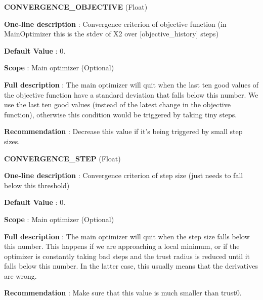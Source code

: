 \begin{DoxyItemize}
\item {\bfseries  \-C\-O\-N\-V\-E\-R\-G\-E\-N\-C\-E\-\_\-\-O\-B\-J\-E\-C\-T\-I\-V\-E } (\-Float) \par
{\bfseries  \-One-\/line description }\-: \-Convergence criterion of objective function (in \-Main\-Optimizer this is the stdev of \-X2 over \mbox{[}objective\-\_\-history\mbox{]} steps) \par
{\bfseries  \-Default \-Value }\-: 0. \par
{\bfseries  \-Scope }\-: \-Main optimizer (\-Optional) \par
{\bfseries  \-Full description }\-: \-The main optimizer will quit when the last ten good values of the objective function have a standard deviation that falls below this number. \-We use the last ten good values (instead of the latest change in the objective function), otherwise this condition would be triggered by taking tiny steps. \par
{\bfseries  \-Recommendation }\-: \-Decrease this value if it's being triggered by small step sizes.\end{DoxyItemize}
\begin{DoxyItemize}
\item {\bfseries  \-C\-O\-N\-V\-E\-R\-G\-E\-N\-C\-E\-\_\-\-S\-T\-E\-P } (\-Float) \par
{\bfseries  \-One-\/line description }\-: \-Convergence criterion of step size (just needs to fall below this threshold) \par
{\bfseries  \-Default \-Value }\-: 0. \par
{\bfseries  \-Scope }\-: \-Main optimizer (\-Optional) \par
{\bfseries  \-Full description }\-: \-The main optimizer will quit when the step size falls below this number. \-This happens if we are approaching a local minimum, or if the optimizer is constantly taking bad steps and the trust radius is reduced until it falls below this number. \-In the latter case, this usually means that the derivatives are wrong. \par
{\bfseries  \-Recommendation }\-: \-Make sure that this value is much smaller than trust0.\end{DoxyItemize}
